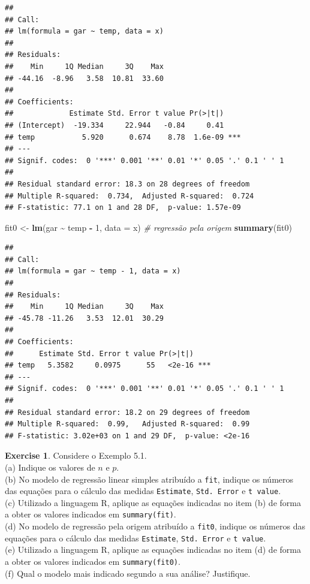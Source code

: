 \documentclass[
]{book}
\newenvironment{Shaded}{\begin{snugshade}}{\end{snugshade}}
\newcommand{\CommentTok}[1]{\textcolor[rgb]{0.56,0.35,0.01}{\textit{#1}}}
\newcommand{\DataTypeTok}[1]{\textcolor[rgb]{0.13,0.29,0.53}{#1}}
\newcommand{\DecValTok}[1]{\textcolor[rgb]{0.00,0.00,0.81}{#1}}
\newcommand{\KeywordTok}[1]{\textcolor[rgb]{0.13,0.29,0.53}{\textbf{#1}}}
\newcommand{\NormalTok}[1]{#1}
\newcommand{\OperatorTok}[1]{\textcolor[rgb]{0.81,0.36,0.00}{\textbf{#1}}}
\newcommand{\StringTok}[1]{\textcolor[rgb]{0.31,0.60,0.02}{#1}}
\theoremstyle{definition}
\theoremstyle{definition}
\theoremstyle{definition}
\newtheorem{exercise}{Exercise}[chapter]
\theoremstyle{remark}
\begin{document}
\begin{verbatim}
## 
## Call:
## lm(formula = gar ~ temp, data = x)
## 
## Residuals:
##    Min     1Q Median     3Q    Max 
## -44.16  -8.96   3.58  10.81  33.60 
## 
## Coefficients:
##             Estimate Std. Error t value Pr(>|t|)    
## (Intercept)  -19.334     22.944   -0.84     0.41    
## temp           5.920      0.674    8.78  1.6e-09 ***
## ---
## Signif. codes:  0 '***' 0.001 '**' 0.01 '*' 0.05 '.' 0.1 ' ' 1
## 
## Residual standard error: 18.3 on 28 degrees of freedom
## Multiple R-squared:  0.734,  Adjusted R-squared:  0.724 
## F-statistic: 77.1 on 1 and 28 DF,  p-value: 1.57e-09
\end{verbatim}

\begin{Shaded}
\begin{Highlighting}[]
\NormalTok{fit0 \textless{}{-}}\StringTok{ }\KeywordTok{lm}\NormalTok{(gar }\OperatorTok{\textasciitilde{}}\StringTok{ }\NormalTok{temp }\OperatorTok{{-}}\StringTok{ }\DecValTok{1}\NormalTok{, }\DataTypeTok{data =}\NormalTok{ x)  }\CommentTok{\# regressão pela origem}
\KeywordTok{summary}\NormalTok{(fit0)}
\end{Highlighting}
\end{Shaded}

\begin{verbatim}
## 
## Call:
## lm(formula = gar ~ temp - 1, data = x)
## 
## Residuals:
##    Min     1Q Median     3Q    Max 
## -45.78 -11.26   3.53  12.01  30.29 
## 
## Coefficients:
##      Estimate Std. Error t value Pr(>|t|)    
## temp   5.3582     0.0975      55   <2e-16 ***
## ---
## Signif. codes:  0 '***' 0.001 '**' 0.01 '*' 0.05 '.' 0.1 ' ' 1
## 
## Residual standard error: 18.2 on 29 degrees of freedom
## Multiple R-squared:  0.99,   Adjusted R-squared:  0.99 
## F-statistic: 3.02e+03 on 1 and 29 DF,  p-value: <2e-16
\end{verbatim}

\begin{exercise}
\protect\hypertarget{exr:unnamed-chunk-127}{}{\label{exr:unnamed-chunk-127} }Considere o Exemplo 5.1.\\
(a) Indique os valores de \(n\) e \(p\).\\
(b) No modelo de regressão linear simples atribuído a \texttt{fit}, indique os números das equações para o cálculo das medidas \texttt{Estimate}, \texttt{Std.\ Error} e \texttt{t\ value}.\\
(c) Utilizado a linguagem R, aplique as equações indicadas no item (b) de forma a obter os valores indicados em \texttt{summary(fit)}.\\
(d) No modelo de regressão pela origem atribuído a \texttt{fit0}, indique os números das equações para o cálculo das medidas \texttt{Estimate}, \texttt{Std.\ Error} e \texttt{t\ value}.\\
(e) Utilizado a linguagem R, aplique as equações indicadas no item (d) de forma a obter os valores indicados em \texttt{summary(fit0)}.\\
(f) Qual o modelo mais indicado segundo a sua análise? Justifique.
\end{exercise}
\end{document}
